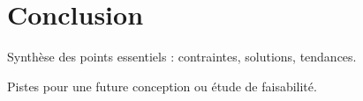 \section{Conclusion}\label{SEC:Conclusion}


Synthèse des points essentiels : contraintes, solutions, tendances.

Pistes pour une future conception ou étude de faisabilité.